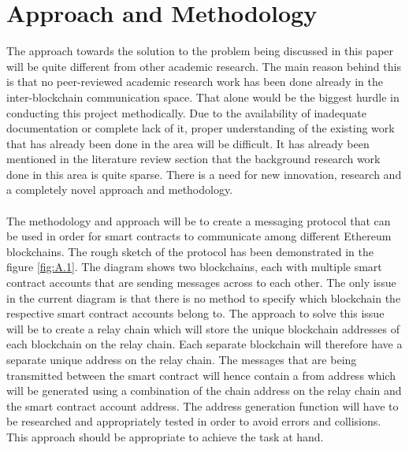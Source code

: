 \documentclass[a4paper,twoside,phd]{BYUPhys}
\begin{document}
\section{Approach and Methodology}
The approach towards the solution to the problem being discussed in this paper will be quite different from other academic research. The main reason behind this is that no peer-reviewed academic research work has been done already in the inter-blockchain communication space. That alone would be the biggest hurdle in conducting this project methodically. Due to the availability of inadequate documentation or complete lack of it, proper understanding of the existing work that has already been done in the area will be difficult. It has already been mentioned in the literature review section that the background research work done in this area is quite sparse. There is a need for new innovation, research and a completely novel approach and methodology.
\\
\\
The methodology and approach will be to create a messaging protocol that can be used in order for smart contracts to communicate among different Ethereum blockchains. The rough sketch of the protocol has been demonstrated in the figure \ref{fig:A.1}. The diagram shows two blockchains, each with multiple smart contract accounts that are sending messages across to each other. The only issue in the current diagram is that there is no method to specify which blockchain the respective smart contract accounts belong to. The approach to solve this issue will be to create a relay chain which will store the unique blockchain addresses of each blockchain on the relay chain. Each separate blockchain will therefore have a separate unique address on the relay chain. The messages that are being transmitted between the smart contract will hence contain a from address which will be generated using a combination of the chain address on the relay chain and the smart contract account address. The address generation function will have to be researched and appropriately tested in order to avoid errors and collisions. This approach should be appropriate to achieve the task at hand.
\end{document}
